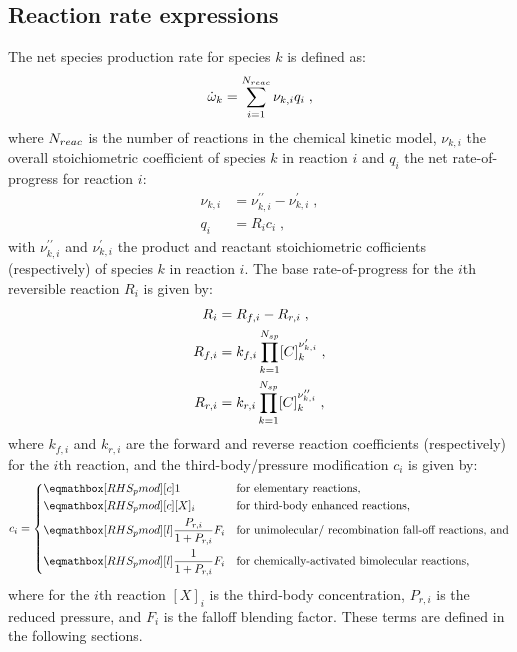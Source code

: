 \documentclass[12pt,number,sort&compress]{elsarticle}
\begin{document}
\subsection{Reaction rate expressions}
\label{s:rop_net}
The net species production rate for species $k$ is defined as:
\begin{equation}
 \label{e:spec_rop}
 \dot{\omega}_{k} = \sum_{i=1}^{\nr/} \nu_{k,i} q_{i}\;,
\end{equation}
where $\nr/$ is the number of reactions in the chemical kinetic model, $\nu_{k, i}$ the overall stoichiometric coefficient of species $k$ in reaction $i$ and $q_i$ the net rate-of-progress for reaction $i$:
\begin{align}
\nu_{k,i} &= \nu^{\prime\prime}_{k,i} - \nu^{\prime}_{k,i} \;, \\
q_{i} &= R_{i} c_{i} \;,
\end{align}
with $\nu^{\prime\prime}_{k,i}$ and $\nu^{\prime}_{k,i}$ the product and reactant stoichiometric cofficients (respectively) of species $k$ in reaction $i$.
The base rate-of-progress for the $i$th reversible reaction $R_{i}$ is given by:
\begin{align}
R_{i} &= {R_{f,i}} - {R_{r,i}}\;, \label{e:ropnet}\\
{R_{f, i}} &= {k_{f, i}} \prod_{k=1}^{\ns/} [C]_{k}^{\nu^{\prime}_{k,i}} \label{e:ropf}\;,\\
{R_{r, i}} &= {k_{r, i}} \prod_{k=1}^{\ns/} [C]_{k}^{\nu^{\prime\prime}_{k,i}} \label{e:ropr}\;,
\end{align}
where ${k_{f, i}}$ and ${k_{r, i}}$ are the forward and reverse reaction coefficients (respectively) for the $i$th reaction, and the third-body\slash pressure modification $c_{i}$ is given by:
\begin{equation}
\label{e:rxn_pressure}
c_i = \begin{dcases}
  \rhs{pmod}{1}[c] &\text{for elementary reactions,} \\
  \rhs{pmod}{[X]_i}[c] &\text{for third-body enhanced reactions,} \\
  \rhs{pmod}{\frac{P_{r,i}}{1 + P_{r,i}} F_i} &\text{for unimolecular\slash~recombination fall-off reactions, and} \\
  \rhs{pmod}{\frac{1}{1 + P_{r,i}} F_i} &\text{for chemically-activated bimolecular reactions,}
  \end{dcases}
\end{equation}
where for the $i$th reaction $[X]_i$ is the third-body concentration, $P_{r,i}$ is the reduced pressure, and $F_i$ is the falloff blending factor.
These terms are defined in the following sections.
\end{document}
